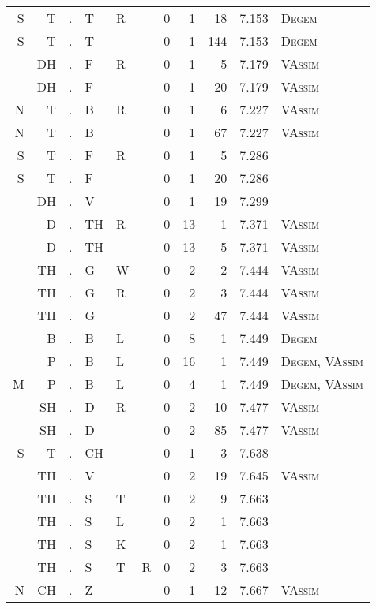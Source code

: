 \begin{longtable}{r@{ } r@{ } c@{ } l@{ } l@{ } l@{ } r r r r l }
S & T & . & T & R &   & 0 & 1 & 18 & 7.153 & \textsc{Degem} \\
S & T & . & T &   &   & 0 & 1 & 144 & 7.153 & \textsc{Degem} \\
  & DH & . & F & R &   & 0 & 1 & 5 & 7.179 & \textsc{VAssim} \\
  & DH & . & F &   &   & 0 & 1 & 20 & 7.179 & \textsc{VAssim} \\
N & T & . & B & R &   & 0 & 1 & 6 & 7.227 & \textsc{VAssim} \\
N & T & . & B &   &   & 0 & 1 & 67 & 7.227 & \textsc{VAssim} \\
S & T & . & F & R &   & 0 & 1 & 5 & 7.286 &  \\
S & T & . & F &   &   & 0 & 1 & 20 & 7.286 &  \\
  & DH & . & V &   &   & 0 & 1 & 19 & 7.299 &  \\
  & D & . & TH & R &   & 0 & 13 & 1 & 7.371 & \textsc{VAssim} \\
  & D & . & TH &   &   & 0 & 13 & 5 & 7.371 & \textsc{VAssim} \\
  & TH & . & G & W &   & 0 & 2 & 2 & 7.444 & \textsc{VAssim} \\
  & TH & . & G & R &   & 0 & 2 & 3 & 7.444 & \textsc{VAssim} \\
  & TH & . & G &   &   & 0 & 2 & 47 & 7.444 & \textsc{VAssim} \\
  & B & . & B & L &   & 0 & 8 & 1 & 7.449 & \textsc{Degem} \\
  & P & . & B & L &   & 0 & 16 & 1 & 7.449 & \textsc{Degem}, \textsc{VAssim} \\
M & P & . & B & L &   & 0 & 4 & 1 & 7.449 & \textsc{Degem}, \textsc{VAssim} \\
  & SH & . & D & R &   & 0 & 2 & 10 & 7.477 & \textsc{VAssim} \\
  & SH & . & D &   &   & 0 & 2 & 85 & 7.477 & \textsc{VAssim} \\
S & T & . & CH &   &   & 0 & 1 & 3 & 7.638 &  \\
  & TH & . & V &   &   & 0 & 2 & 19 & 7.645 & \textsc{VAssim} \\
  & TH & . & S & T &   & 0 & 2 & 9 & 7.663 &  \\
  & TH & . & S & L &   & 0 & 2 & 1 & 7.663 &  \\
  & TH & . & S & K &   & 0 & 2 & 1 & 7.663 &  \\
  & TH & . & S & T & R & 0 & 2 & 3 & 7.663 &  \\
N & CH & . & Z &   &   & 0 & 1 & 12 & 7.667 & \textsc{VAssim} \\

\end{longtable}
